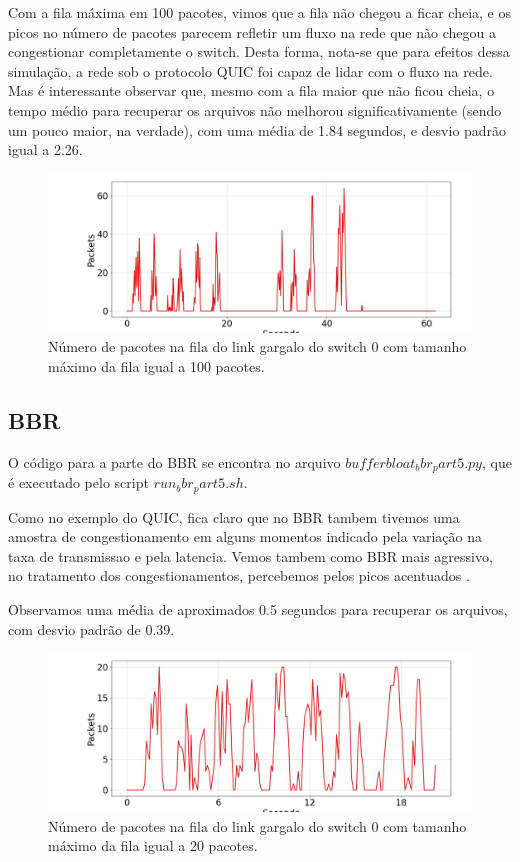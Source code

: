 \documentclass[a4paper,12pt]{article}
\begin{document}
Com a fila máxima em 100 pacotes, vimos que a fila não chegou a ficar cheia, e os picos no número de pacotes parecem refletir um fluxo na rede que não chegou a congestionar completamente o switch. Desta forma, nota-se que para efeitos dessa simulação, a rede sob o protocolo QUIC foi capaz de lidar com o fluxo na rede. Mas é interessante observar que, mesmo com a fila maior que não ficou cheia, o tempo médio para recuperar os arquivos não melhorou significativamente (sendo um pouco maior, na verdade), com uma média de 1.84 segundos, e desvio padrão igual a 2.26.

\begin{figure}[ht!]
  \centering
  \includegraphics[width=0.5\columnwidth]{./bufferbloat/bb-q100/quic-part5-buffer-q100.jpg}
  \caption{Número de pacotes na fila do link gargalo do switch 0 com tamanho máximo da fila igual a 100 pacotes.}
\end{figure}

\subsection{BBR}

O código para a parte do BBR se encontra no arquivo $bufferbloat_bbr_part5.py$, que é executado pelo script $run_bbr_part5.sh$.

Como no exemplo do QUIC, fica claro que no BBR tambem tivemos uma amostra de congestionamento em alguns momentos indicado pela variação na taxa de transmissao e pela latencia. Vemos tambem como BBR  mais agressivo, no tratamento dos congestionamentos, percebemos pelos picos acentuados . 

Observamos uma média de aproximados 0.5 segundos para recuperar os arquivos, com desvio padrão de 0.39.


\begin{figure}[ht!]
	\centering
	\includegraphics[width=0.5\columnwidth]{./bufferbloat/bb-q20/bbr-part5-buffer-q20.jpg}
	\caption{Número de pacotes na fila do link gargalo do switch 0 com tamanho máximo da fila igual a 20 pacotes.}
\end{figure}
\end{document}
